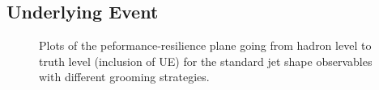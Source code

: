\documentclass[11pt,letterpaper]{article}
\begin{document}
\subsection{Underlying Event}\label{sec:UE}


\begin{figure}
  \caption{Plots of the peformance-resilience plane going from hadron level to truth level (inclusion of UE) for the standard jet shape observables with different grooming strategies.}\label{fig:grooming-UE}
\end{figure}
\end{document}
